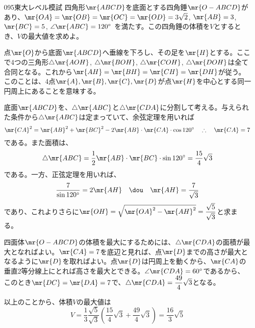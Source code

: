 \begin{thm}{095}{}{東大レベル模試}
 四角形$\mr{ABCD}$を底面とする四角錘$\mr{O-ABCD}$があり、$\mr{OA}=\mr{OB}=\mr{OC}=\mr{OD}=3\sqrt{2}$, $\mr{AB}=3$, $\mr{BC}=5$, $\angle\mr{ABC}=120^\circ$ を満たす。この四角錘の体積を$V$とするとき、$V$の最大値を求めよ。
\end{thm}

点$\mr{O}$から底面$\mr{ABCD}$へ垂線を下ろし、その足を$\mr{H}$とする。ここで4つの三角形$\triangle\mr{AOH}$, $\triangle\mr{BOH}$, $\triangle\mr{COH}$, $\triangle\mr{DOH}$は全て合同となる。これから$\mr{AH}=\mr{BH}=\mr{CH}=\mr{DH}$が従う。このことは、4点$\mr{A}, \mr{B}, \mr{C}, \mr{D}$が点$\mr{H}$を中心とする同一円周上にあることを意味する。

底面$\mr{ABCD}$を、$\triangle\mr{ABC}$と$\triangle\mr{CDA}$に分割して考える。与えられた条件から$\triangle\mr{ABC}$は定まっていて、余弦定理を用いれば
\[ \mr{CA}^2=\mr{AB}^2+\mr{BC}^2-2\mr{AB}\cdot\mr{CA}\cdot\cos 120^\circ \quad\therefore\quad \mr{CA}=7 \]
である。また面積は、
\[ \triangle\mr{ABC}=\frac{1}{2}\mr{AB}\cdot\mr{BC}\cdot\sin 120^\circ=\frac{15}{4}\sqrt{3} \]
である。一方、正弦定理を用いれば、
\[ \frac{7}{\sin 120^\circ}=2\mr{AH} \quad\dou\quad \mr{AH}=\frac{7}{\sqrt{3}} \]
であり、これよりさらに$\mr{OH}=\sqrt{\mr{OA}^2-\mr{AH}^2}=\dfrac{\sqrt{5}}{\sqrt{3}}$と求まる。

四面体$\mr{O-ABCD}$の体積を最大にするためには、$\triangle\mr{CDA}$の面積が最大となればよい。$\mr{CA}=7$を底辺と見れば、点$\mr{D}$までの高さが最大となるように$\mr{D}$を取ればよい。点$\mr{D}$は円周上を動くから、$\mr{CA}$の垂直2等分線上にとれば高さを最大とできる。$\angle\mr{CDA}=60^\circ$であるから、このとき$\mr{DC}=\mr{DA}=7$で、$\triangle\mr{CDA}=\dfrac{49}{4}\sqrt{3}$となる。

以上のことから、体積$V$の最大値は
\[ V=\frac{1}{3}\frac{\sqrt{5}}{\sqrt{3}}\left(\frac{15}{4}\sqrt{3}+\frac{49}{4}\sqrt{3}\right)=\frac{16}{3}\sqrt{5} \]